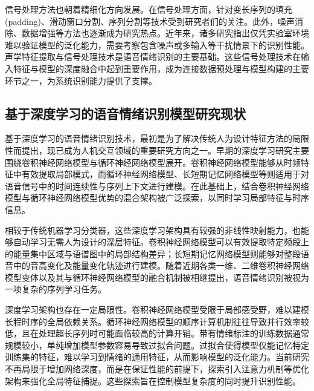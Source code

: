 信号处理方法也朝着精细化方向发展。在信号处理方面，针对变长序列的填充(padding)、滑动窗口分割、序列分割等技术受到研究者们的关注。此外，噪声消除、数据增强等方法也逐渐成为研究热点\cite{leem2024selective,lin2023chunk}。近年来，诸多研究指出仅凭实验室环境难以验证模型的泛化能力，需要考察包含噪声或多输入等干扰情景下的识别性能\cite{su2023unsupervised,lu2022domain,gao2024adversarial}。声学特征提取与信号处理技术是语音情绪识别的主要基础。这些信号处理技术在输入特征与模型的深度融合中起到重要作用，成为连接数据预处理与模型构建的主要环节之一，为系统识别能力提供了支撑\cite{zhang2020transfer,ma2023review}。

\subsection{基于深度学习的语音情绪识别模型研究现状}

基于深度学习的语音情绪识别技术，最初是为了解决传统人为设计特征方法的局限性而提出，现已成为人机交互领域的重要研究方向之一。早期的深度学习研究主要围绕卷积神经网络模型与循环神经网络模型展开。卷积神经网络模型能够从时频特征中有效提取局部模式，而循环神经网络模型、长短期记忆网络模型等则适用于对语音信号中的时间连续性与序列上下文进行建模\cite{liu2023dualrobustness,zhang2023cnn,lin2023chunk}。在此基础上，结合卷积神经网络模型与循环神经网络模型优势的混合架构被广泛探索，以同时学习局部特征与时序信息\cite{peng2021efficient}。

相较于传统机器学习分类器，这些深度学习架构具有较强的非线性映射能力，也能够自动学习无需人为设计的深层特征。卷积神经网络模型可以有效提取特定频段上的能量集中区域与语谱图中的局部结构差异；长短期记忆网络模型则能够对整段语音中的音高变化及能量变化轨迹进行建模\cite{liu2023dualrobustness,lin2023chunk,peng2021efficient}。随着近期各类一维、二维卷积神经网络模型变体以及其与循环神经网络模型的融合机制被相继提出，语音情绪识别被视为一项复杂的序列学习任务\cite{hou2022multi,zhang2023cnn}。

深度学习架构也存在一定局限性。卷积神经网络模型受限于局部感受野，难以建模长程时序的全局依赖关系\cite{liu2023dualrobustness,peng2021efficient,chen2023dwformer,lin2023chunk,mirsamadi2017automatic}。循环神经网络模型的顺序计算机制往往导致并行效率较低，且在处理超长序列时可能面临较高的计算开销。带有情绪标注的训练数据通常规模较小，单纯增加模型参数容易导致过拟合问题。过拟合使得模型仅能记忆特定训练集的特征，难以学习到情绪的通用特征，从而影响模型的泛化能力\cite{mao2022enhancing,leem2024selective}。当前研究不再局限于增加网络深度，而是在保证性能的前提下，探索引入注意力机制等优化架构来强化全局特征捕捉。这些探索旨在控制模型复杂度的同时提升识别性能\cite{wang2024swin}。

